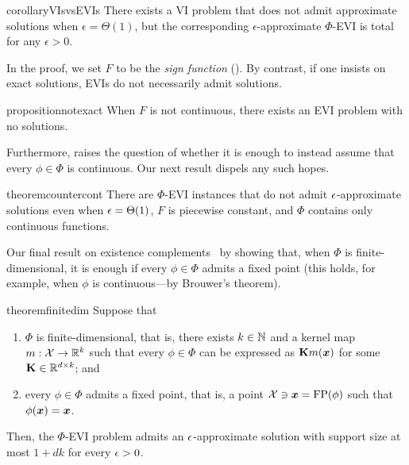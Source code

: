 \begin{restatable}{corollary}{VIsvsEVIs}
    \label{prop:VI-vs-EVIs}
    There exists a VI problem that does not admit approximate solutions when $\epsilon = \Theta(1)$, but the corresponding $\epsilon$-approximate $\Phi$-EVI is total for any $\epsilon > 0$.
\end{restatable}

In the proof, we set $F$ to be the \emph{sign function} (). By contrast, if one insists on exact solutions, EVIs do not necessarily admit solutions.

\begin{restatable}{proposition}{notexact}
    \label{prop:notexact}
    When $F$ is not continuous, there exists an EVI problem with no solutions.
\end{restatable}

Furthermore,  raises the question of whether it is enough to instead assume that every $\phi \in \Phi$ is continuous. Our next result dispels any such hopes.

\begin{restatable}{theorem}{countercont}
    \label{theorem:continuous-counterexample}
    There are $\Phi$-EVI instances that do not admit $\epsilon$-approximate solutions even when $\epsilon = \Theta(1)$, $F$ is piecewise constant, and $\Phi$ contains only continuous functions.
\end{restatable}

Our final result on existence complements~ by showing that, when $\Phi$ is finite-dimensional, it is enough if every $\phi \in \Phi$ admits a fixed point (this holds, for example, when $\phi$ is continuous---by Brouwer's theorem).

\begin{restatable}{theorem}{finitedim}
    \label{theorem:finitedim}
    Suppose that 
    \begin{enumerate}%
        \item $\Phi$ is finite-dimensional, that is, there exists $k \in \mathbb N$ and a kernel map $m : {\mathcal{X}} \to \mathbb R^k$ such that every $\phi \in \Phi$ can be expressed as ${\mathbf{K}} m({\bm{x}})$ for some ${\mathbf{K}} \in \mathbb R^{d \times k}$; and
        \item every $\phi \in \Phi$ admits a fixed point, that is, a point ${\mathcal{X}} \ni {\bm{x}} = \operatorname{FP}(\phi)$ such that $\phi({\bm{x}}) = {\bm{x}}$.
    \end{enumerate} Then, the $\Phi$-EVI problem admits an $\epsilon$-approximate solution with support size at most $1+dk$ for every $\epsilon > 0$.
\end{restatable}


